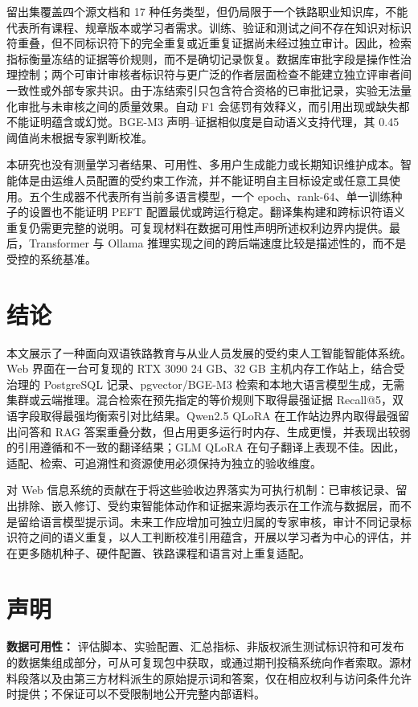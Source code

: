 留出集覆盖四个源文档和 17 种任务类型，但仍局限于一个铁路职业知识库，不能代表所有课程、规章版本或学习者需求。训练、验证和测试之间不存在知识对标识符重叠，但不同标识符下的完全重复或近重复证据尚未经过独立审计。因此，检索指标衡量冻结的证据等价规则，而不是确切记录恢复。数据库审批字段是操作性治理控制；两个可审计审核者标识符与更广泛的作者层面检查不能建立独立评审者间一致性或外部专家共识。由于冻结索引只包含符合资格的已审批记录，实验无法量化审批与未审核之间的质量效果。自动 F1 会惩罚有效释义，而引用出现或缺失都不能证明蕴含或幻觉。BGE-M3 声明--证据相似度是自动语义支持代理，其 0.45 阈值尚未根据专家判断校准。

本研究也没有测量学习者结果、可用性、多用户生成能力或长期知识维护成本。智能体是由运维人员配置的受约束工作流，并不能证明自主目标设定或任意工具使用。五个生成器不代表所有当前多语言模型，一个 epoch、rank-64、单一训练种子的设置也不能证明 PEFT 配置最优或跨运行稳定。翻译集构建和跨标识符语义重复仍需更完整的说明。可复现材料在数据可用性声明所述权利边界内提供。最后，Transformer 与 Ollama 推理实现之间的跨后端速度比较是描述性的，而不是受控的系统基准。

\section{结论}

本文展示了一种面向双语铁路教育与从业人员发展的受约束人工智能智能体系统。Web 界面在一台可复现的 RTX 3090 24 GB、32 GB 主机内存工作站上，结合受治理的 PostgreSQL 记录、pgvector/BGE-M3 检索和本地大语言模型生成，无需集群或云端推理。混合检索在预先指定的等价规则下取得最强证据 Recall@5，双语字段取得最强均衡索引对比结果。Qwen2.5 QLoRA 在工作站边界内取得最强留出问答和 RAG 答案重叠分数，但占用更多运行时内存、生成更慢，并表现出较弱的引用遵循和不一致的翻译结果；GLM QLoRA 在句子翻译上表现不佳。因此，适配、检索、可追溯性和资源使用必须保持为独立的验收维度。

对 Web 信息系统的贡献在于将这些验收边界落实为可执行机制：已审核记录、留出排除、嵌入修订、受约束智能体动作和证据来源均表示在工作流与数据层，而不是留给语言模型提示词。未来工作应增加可独立归属的专家审核，审计不同记录标识符之间的语义重复，以人工判断校准引用蕴含，开展以学习者为中心的评估，并在更多随机种子、硬件配置、铁路课程和语言对上重复适配。

\section{声明}

\textbf{数据可用性：} 评估脚本、实验配置、汇总指标、非版权派生测试标识符和可发布的数据集组成部分，可从可复现包中获取，或通过期刊投稿系统向作者索取。源材料段落以及由第三方材料派生的原始提示词和答案，仅在相应权利与访问条件允许时提供；不保证可以不受限制地公开完整内部语料。

